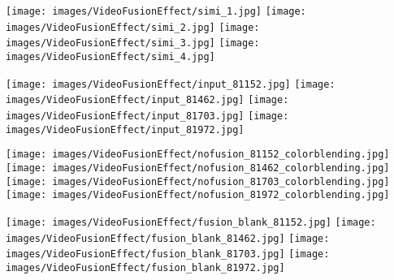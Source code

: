 \documentclass[runningheads]{llncs}
\begin{document}
\begin{figure*}
\centering

    \begin{minipage}{\textwidth}
    \centering
    \texttt{[image: images/VideoFusionEffect/simi\_1.jpg]}\hspace{-0.06 cm}
    \texttt{[image: images/VideoFusionEffect/simi\_2.jpg]}\hspace{-0.06 cm}
    \texttt{[image: images/VideoFusionEffect/simi\_3.jpg]}\hspace{-0.06 cm}
    \texttt{[image: images/VideoFusionEffect/simi\_4.jpg]}
    \end{minipage}

    \begin{minipage}{\textwidth}
    \centering
    \texttt{[image: images/VideoFusionEffect/input\_81152.jpg]}\hspace{-0.06 cm}
    \texttt{[image: images/VideoFusionEffect/input\_81462.jpg]}\hspace{-0.06 cm}
    \texttt{[image: images/VideoFusionEffect/input\_81703.jpg]}\hspace{-0.06 cm}
    \texttt{[image: images/VideoFusionEffect/input\_81972.jpg]}
    \end{minipage}

    \begin{minipage}{\textwidth}
    \centering
    \texttt{[image: images/VideoFusionEffect/nofusion\_81152\_colorblending.jpg]}\hspace{-0.06 cm}
    \texttt{[image: images/VideoFusionEffect/nofusion\_81462\_colorblending.jpg]}\hspace{-0.06 cm}
    \texttt{[image: images/VideoFusionEffect/nofusion\_81703\_colorblending.jpg]}\hspace{-0.06 cm}
    \texttt{[image: images/VideoFusionEffect/nofusion\_81972\_colorblending.jpg]}
    \end{minipage}

    \begin{minipage}{\textwidth}
    \centering
    \texttt{[image: images/VideoFusionEffect/fusion\_blank\_81152.jpg]}\hspace{-0.06 cm}
    \texttt{[image: images/VideoFusionEffect/fusion\_blank\_81462.jpg]}\hspace{-0.06 cm}
    \texttt{[image: images/VideoFusionEffect/fusion\_blank\_81703.jpg]}\hspace{-0.06 cm}
    \texttt{[image: images/VideoFusionEffect/fusion\_blank\_81972.jpg]}
    \end{minipage}


\end{figure*}
\end{document}
